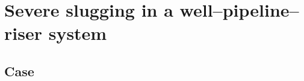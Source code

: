 \documentclass[a4paper,fleqn]{cas-sc}
\begin{document}
\begin{table}[htbp]
\caption{NumPy and JAX backends on the application case.}\label{tab:performance}
\footnotesize


\end{table}

\begin{table}[htbp]
\caption{Cost of the transients of the application and of the steady states.}\label{tab:cost}
\footnotesize


\end{table}

\section{Severe slugging in a well--pipeline--riser system}\label{sec:application}

\subsection{Case}\label{sec:case}
\end{document}
